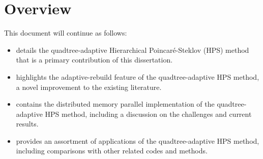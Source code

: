 \section{Overview}

This document will continue as follows:

\begin{itemize}
    \item{ details the quadtree-adaptive Hierarchical Poincaré-Steklov (HPS) method that is a primary contribution of this dissertation.}
    \item{ highlights the adaptive-rebuild feature of the quadtree-adaptive HPS method, a novel improvement to the existing literature.}
    \item{ contains the distributed memory parallel implementation of the quadtree-adaptive HPS method, including a discussion on the challenges and current results.}
    \item{ provides an assortment of applications of the quadtree-adaptive HPS method, including comparisons with other related codes and methods.}
\end{itemize}